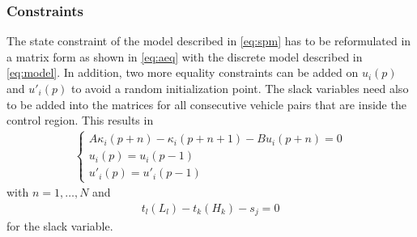 \documentclass[letterpaper,10pt,conference]{ieeeconf}
\begin{document}
\subsubsection{Constraints}
The state constraint of the model described in \eqref{eq:spm} has to be reformulated in a matrix form as shown in \eqref{eq:aeq} with the discrete model described in \eqref{eq:model}. In addition, two more equality constraints can be added on $u_i(p)$ and $u'_i(p)$ to avoid a random initialization point. The slack variables need also to be added into the matrices for all consecutive vehicle pairs that are inside the control region. This results in 
\begin{align}\label{eq1car}
        \begin{cases}
            A\kappa_i(p+n)-\kappa_i(p+n+1) - Bu_i(p+n) = 0\\
            u_i(p) = u_i(p-1)\\
            u'_i(p) = u'_i(p-1)
        \end{cases}
\end{align}
with $n=1,\dots,N$ and 
\begin{align}\label{eq1car2}
    t_l(L_l) - t_k(H_k) -s_j = 0
\end{align}
for the slack variable.\\ \indent
\end{document}
